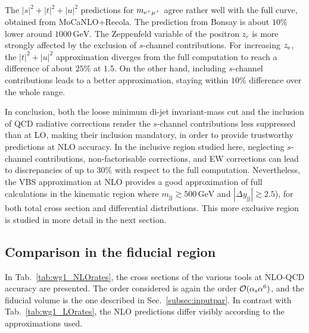 \documentclass[twocolumn,epjc3]{svjour3} %
\newcommand{\Pj}{\ensuremath{\text{j}}\xspace}
\newcommand{\GeV}{\ensuremath{\,\text{GeV}}\xspace}
\begin{document}
    The $|s|^2+|t|^2+|u|^2$ predictions for $m_{\rm e^+\mu^+}$ agree rather well with the full curve, obtained from {\sc MoCa\-NLO+Recola}.
    The prediction from {\sc Bonsay} is about $10\%$ lower around $1000 \GeV$.
    The Zeppenfeld variable of the positron $z_e$ is more strongly affected by the exclusion of $s$-channel contributions.
    For increasing $z_{\rm e}$, the $|t|^2+|u|^2$ approximation diverges from the full computation to reach a difference of about $25\%$ at $1.5$.
    On the other hand, including $s$-channel contributions leads to a better approximation, staying within $10\%$ difference over the whole range.

    In conclusion, both the loose minimum di-jet invariant-mass cut and the inclusion of QCD radiative corrections render the $s$-channel contributions less suppressed than at LO, making their inclusion mandatory, in order to provide trustworthy predictions at NLO accuracy.
    In the inclusive region studied here, neglecting $s$-channel contributions, non-factorisable corrections, and EW corrections can lead to discrepancies of up to $30\%$ with respect to the full computation.
    Nevertheless, the VBS approximation at NLO provides a good approximation of full calculations in the kinematic region where $m_{\Pj\Pj} \gtrsim 500 \GeV$ and $|\Delta y_{\Pj\Pj}| \gtrsim 2.5$), for both total cross section and differential distributions.
    This more exclusive region is studied in more detail in the next section.
    \subsection{Comparison in the fiducial region}
    \label{sec:fidNLO}
    In Tab.~\ref{tab:wg1_NLOrates}, the cross sections of the various tools at NLO-QCD accuracy are presented.
    The order considered is again the order $\mathcal{O}(\alpha_{\rm s}\alpha^6)$, and the fiducial volume is the one described in Sec.~\ref{subsec:inputpar}.
    In contrast with Tab.~\ref{tab:wg1_LOrates}, the NLO predictions differ visibly according to the approximations used.
\end{document}
